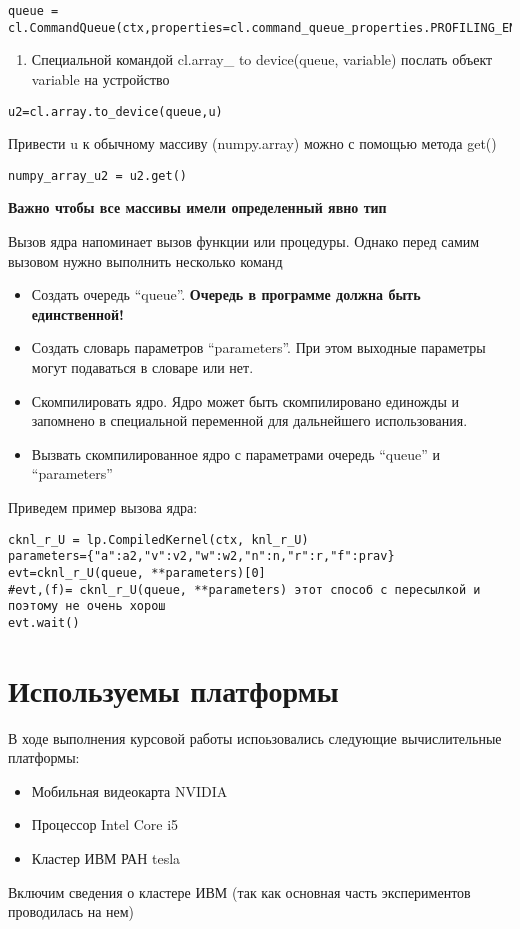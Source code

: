 \documentclass{scrartcl}
\begin{document}
\begin{verbatim}
queue = cl.CommandQueue(ctx,properties=cl.command_queue_properties.PROFILING_ENABLE)
\end{verbatim}
\begin{enumerate}
\item Специальной командой cl.array\_{} to device(queue, variable) послать объект variable на устройство
\end{enumerate}

\begin{verbatim}
u2=cl.array.to_device(queue,u)
\end{verbatim}
Привести u к обычному массиву (numpy.array) можно с помощью метода get()

\begin{verbatim}
numpy_array_u2 = u2.get()
\end{verbatim}
\bfseries Важно чтобы все массивы имели определенный явно тип \mdseries
 
Вызов ядра напоминает вызов функции или процедуры. Однако перед самим вызовом нужно
выполнить несколько команд
\begin{itemize}
\item Создать очередь ``queue''. \bfseries Очередь в программе должна быть единственной! \mdseries
\item Создать словарь параметров ``parameters''. При этом выходные параметры могут подаваться в словаре или нет.
\item Скомпилировать ядро. Ядро может быть скомпилировано единожды и запомнено в специальной переменной для дальнейшего использования.
\item Вызвать скомпилированное ядро с параметрами очередь ``queue'' и ``parameters''
\end{itemize}
Приведем пример вызова ядра:

\begin{verbatim}
cknl_r_U = lp.CompiledKernel(ctx, knl_r_U)
parameters={"a":a2,"v":v2,"w":w2,"n":n,"r":r,"f":prav}
evt=cknl_r_U(queue, **parameters)[0]
#evt,(f)= cknl_r_U(queue, **parameters) этот способ с пересылкой и поэтому не очень хорош
evt.wait()
\end{verbatim}
\section{Используемы платформы}
\label{sec-9}

В ходе выполнения курсовой работы испоьзовались следующие вычислительные
платформы:
\begin{itemize}
\item Мобильная видеокарта NVIDIA
\item Процессор Intel Core i5
\item Кластер ИВМ РАН tesla
\end{itemize}
Включим сведения о кластере ИВМ (так как основная часть экспериментов проводилась на нем)
\end{document}

